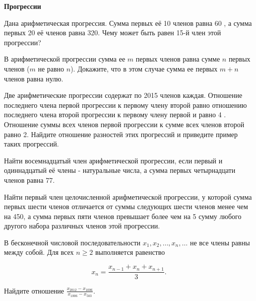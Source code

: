 \centerline{\bf \Huge Прогрессии}

\begin{flushright}
        \scriptsize{}
\end{flushright}

Дана арифметическая прогрессия. Сумма первых её 10 членов равна 60 , а сумма первых 20 её членов равна 320. Чему может быть равен 15-й член этой прогрессии?

В арифметической прогрессии сумма ее $m$ первых членов равна сумме $n$ первых членов ($m$ не равно $n$). Докажите, что в этом случае сумма ее первых $m+n$ членов равна нулю.

Две арифметические прогрессии содержат по 2015 членов каждая. Отношение последнего члена первой прогрессии к первому члену второй равно отношению последнего члена второй прогрессии к первому члену первой и равно 4 . Отношение суммы всех членов первой прогрессии к сумме всех членов второй равно 2. Найдите отношение разностей этих прогрессий и приведите пример таких прогрессий.

Найти восемнадцатый член арифметической прогрессии, если первый и одиннадцатый её члены - натуральные числа, а сумма первых четырнадцати членов равна 77.

Найти первый член целочисленной арифметической прогрессии, у которой сумма первых шести членов отличается от суммы следующих шести членов менее чем на 450, а сумма первых пяти членов превышает более чем на 5 сумму любого другого набора различных членов этой прогрессии.

В бесконечной числовой последовательности $x_1, x_2, \ldots, x_n, \ldots$ не все члены равны между собой. Для всех $n \geqslant 2$ выполняется равенство

$$
x_n=\frac{x_{n-1}+x_n+x_{n+1}}{3} .
$$


Найдите отношение $\frac{x_{2012}-x_{1006}}{x_{1006}-x_{503}}$.